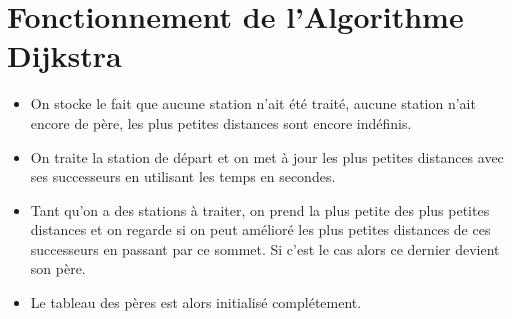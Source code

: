 \documentclass[a4]{article}
\begin{document}
\section{Fonctionnement de l'Algorithme Dijkstra}
\begin{itemize}
\item On stocke le fait que aucune station n'ait été traité, aucune 
station n'ait encore de père, les plus petites distances sont encore indéfinis.\newline 
\item On traite la station de départ et on met à jour les plus petites distances 
avec ses successeurs en utilisant les temps en secondes. \newline
\item Tant qu'on a des stations à traiter, on prend la plus petite des plus petites distances  et on regarde si on peut amélioré les plus petites distances de ces successeurs en passant par ce sommet. Si c'est le cas alors ce dernier devient son père. \newline
\item Le tableau des pères est alors initialisé complétement.
\end{itemize}
\end{document}
